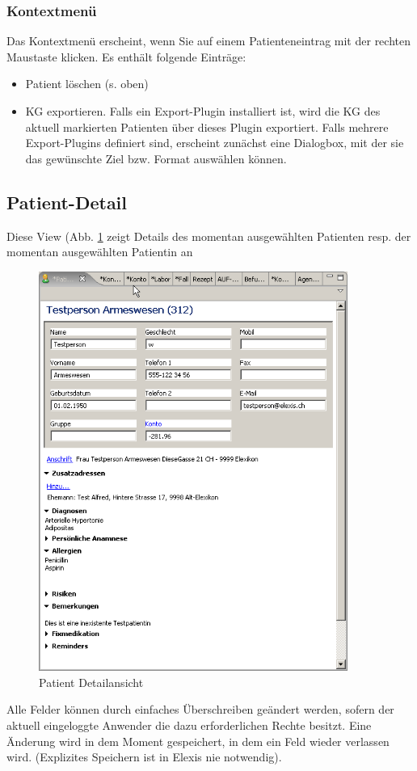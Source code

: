 \subsubsection{Kontextmenü}
Das Kontextmenü erscheint, wenn Sie auf einem Pa\-tien\-ten\-eintrag mit der rech\-ten
Maus\-taste klicken. Es enthält fol\-gende Ein\-träge:
\begin{itemize}
  \item Patient löschen (s. oben)
  \item KG exportieren. Falls ein Export-Plugin installiert ist, wird die KG des
  aktuell markierten Patienten über dieses Plugin exportiert. Falls mehrere
  Export-Plugins definiert sind, erscheint zunächst eine Dialogbox, mit der sie
  das gewünschte Ziel bzw. Format auswählen können.
\end{itemize}


\subsection{Patient-Detail}
Diese View (Abb. \ref{fig:patdetail} zeigt Details des momentan ausgewählten
Patienten resp. der momentan ausgewählten Patientin an
\begin{figure}[htp]
\begin{center}
  \includegraphics[width=0.9\textwidth]{images/patdetail}
  \caption{Patient Detailansicht}
  \label{fig:patdetail}
\end{center}
\end{figure}
Alle Felder können durch einfaches Überschreiben geändert werden, sofern der
aktuell eingeloggte Anwender die dazu erforderlichen Rechte besitzt. Eine
Änderung wird in dem Moment gespeichert, in dem ein Feld wieder verlassen wird.
(Explizites Speichern ist in Elexis nie notwendig).

